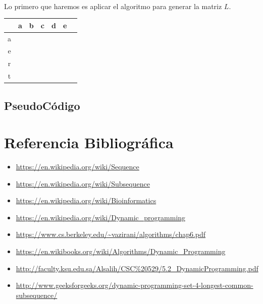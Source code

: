 \documentclass{article}
\begin{document}
		\paragraph{}
		Lo primero que haremos es aplicar el algoritmo para generar la matriz $L$.
		
		\begin{center}
  			\begin{tabular}{ | c | c | c | c | c | c | c | }
    				\hline
				   & a & b  & c  & d & e \\ \hline
				a &   &   &    &    &     \\ \hline
				e &   &   &    &    &    \\ \hline
				r &   &   &    &    &    \\ \hline
				t &   &   &    &    &    \\
				\hline
			\end{tabular}
		\end{center}

	
	\subsection{PseudoCódigo}

\section{Referencia Bibliográfica}

	\begin{itemize}
		\item \url{https://en.wikipedia.org/wiki/Sequence}	
		\item \url{https://en.wikipedia.org/wiki/Subsequence}	
		\item \url{https://en.wikipedia.org/wiki/Bioinformatics}	
		\item \url{https://en.wikipedia.org/wiki/Dynamic_programming}	
		\item \url{https://www.cs.berkeley.edu/~vazirani/algorithms/chap6.pdf}	
		\item \url{https://en.wikibooks.org/wiki/Algorithms/Dynamic_Programming}	
		\item \url{http://faculty.ksu.edu.sa/Alsalih/CSC%20529/5.2_DynamicProgramming.pdf}	
		\item \url{http://www.geeksforgeeks.org/dynamic-programming-set-4-longest-common-subsequence/}	
		
		
		
	\end{itemize}
\end{document}
